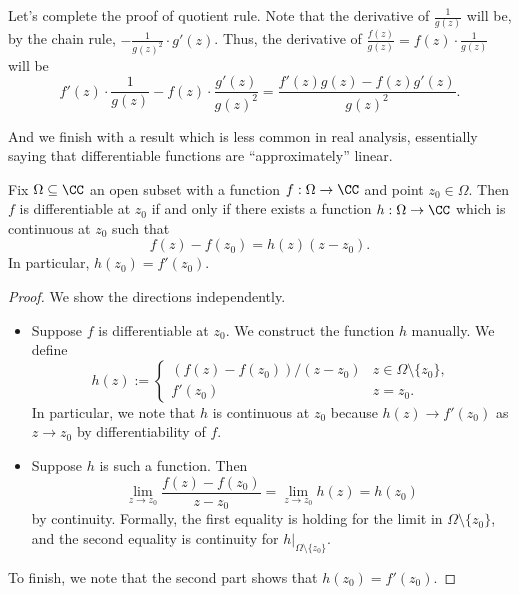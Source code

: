 \begin{remark}[Nir]
	Let's complete the proof of quotient rule. Note that the derivative of $\frac1{g(z)}$ will be, by the chain rule, $-\frac1{g(z)^2}\cdot g'(z)$. Thus, the derivative of $\frac{f(z)}{g(z)}=f(z)\cdot\frac1{g(z)}$ will be
	\[f'(z)\cdot\frac1{g(z)}-f(z)\cdot\frac{g'(z)}{g(z)^2}=\frac{f'(z)g(z)-f(z)g'(z)}{g(z)^2}.\]
\end{remark}
And we finish with a result which is less common in real analysis, essentially saying that differentiable functions are ``approximately'' linear.
\begin{proposition}
	Fix $\Omega\subseteq\CC$ an open subset with a function $f:\Omega\to\CC$ and point $z_0\in\Omega$. Then $f$ is differentiable at $z_0$ if and only if there exists a function $h:\Omega\to\CC$ which is continuous at $z_0$ such that
	\[f(z)-f(z_0)=h(z)(z-z_0).\]
	In particular, $h(z_0)=f'(z_0)$.
\end{proposition}
\begin{proof}
	We show the directions independently.
	\begin{itemize}
		\item Suppose $f$ is differentiable at $z_0$. We construct the function $h$ manually. We define
		\[h(z):=\begin{cases}
			(f(z)-f(z_0))/(z-z_0) & z\in\Omega\setminus\{z_0\}, \\
			f'(z_0) & z=z_0.
		\end{cases}\]
		In particular, we note that $h$ is continuous at $z_0$ because $h(z)\to f'(z_0)$ as $z\to z_0$ by differentiability of $f$.
		\item Suppose $h$ is such a function. Then
		\[\lim_{z\to z_0}\frac{f(z)-f(z_0)}{z-z_0}=\lim_{z\to z_0}h(z)=h(z_0)\]
		by continuity. Formally, the first equality is holding for the limit in $\Omega\setminus\{z_0\}$, and the second equality is continuity for $h|_{\Omega\setminus\{z_0\}}$.
	\end{itemize}
	To finish, we note that the second part shows that $h(z_0)=f'(z_0)$.
\end{proof}